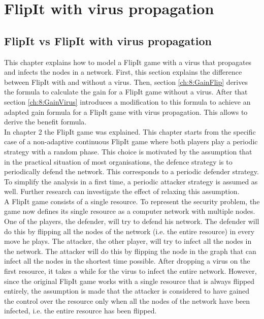 \chapter{FlipIt with virus propagation }
\label{cha:6}


\section{FlipIt vs FlipIt with virus propagation}

This chapter explains how to model a FlipIt game with a virus that propagates and infects the nodes in a network. First, this section explains the difference between FlipIt with and without a virus. 
Then, section \ref{ch:8:GainFlip} derives the formula to calculate the gain for a FlipIt game without a virus. After that section \ref{ch:8:GainVirus} introduces a modification to this formula to achieve an adapted gain formula for a FlipIt game with virus propagation. This allows to derive the benefit formula.\\


In chapter 2 the FlipIt game was explained.  This chapter starts from the specific case of a non-adaptive continuous FlipIt game where both players play a periodic strategy with a random phase. This choice is motivated by the assumption that in the practical situation of most organisations, the defence strategy is to periodically defend the network. This corresponds to a periodic defender strategy. To simplify the analysis in a first time, a periodic attacker strategy is assumed as well. Further research can investigate the effect of relaxing this assumption.\\


A FlipIt game consists of a single resource. To represent the security problem, the game now defines its single resource as a computer network with multiple
nodes. One of the players, the defender, will try to defend his network. The defender
will do this by flipping all the nodes of the network (i.e. the entire resource) in every move he plays. The
attacker, the other player, will try to infect all the nodes in the network. The attacker
will do this by flipping the node in the graph that can infect all the nodes in the
shortest time possible. After dropping a virus on the first resource, it takes a while for the virus to infect the entire network. However, since the original FlipIt game works with a single resource that is always flipped entirely, the assumption is made that the attacker is considered to have gained the control over the resource only when all the nodes of the network have been infected, i.e. the entire resource has been flipped. 


